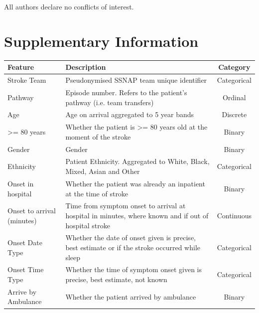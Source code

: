 \documentclass[12pt,a4paper, pdftex]{elsarticle}
\newcommand{\beginsupplement}{%
        \setcounter{table}{0}
        \renewcommand{\thetable}{S\arabic{table}}%
        \setcounter{figure}{0}
        \renewcommand{\thefigure}{S\arabic{figure}}%
     }
\begin{document}
All authors declare no conflicts of interest.






\clearpage


\beginsupplement
\section*{Supplementary Information}


        \begin{longtable}{|l|p{8.5cm}|c|}
        \hline
        {\bf Feature} & {\bf Description} & {\bf Category} \\
        \hline
        \endhead
        \hline
        \endfoot
        \endlastfoot
        Stroke Team & Pseudonymised SSNAP team unique identifier & Categorical \\
        Pathway & Episode number. Refers to the patient's pathway (i.e. team transfers) & Ordinal \\
        Age & Age on arrival aggregated to 5 year bands & Discrete \\
        >= 80 years & Whether the patient is >= 80 years old at the moment of the stroke & Binary \\
        Gender & Gender & Binary \\
        Ethnicity & Patient Ethnicity. Aggregated to White, Black, Mixed, Asian and Other & Categorical \\
        Onset in hospital & Whether the patient was already an inpatient at the time of stroke & Binary \\
        Onset to arrival (minutes) & Time from symptom onset to arrival at hospital in minutes, where known and if out of hospital stroke & Continuous \\
        Onset Date Type & Whether the date of onset given is precise, best estimate or if the stroke occurred while sleep & Categorical \\
        Onset Time Type & Whether the time of symptom onset given is precise, best estimate, not known & Categorical \\
        Arrive by Ambulance & Whether the patient arrived by ambulance & Binary \\

\end{longtable}
\end{document}
